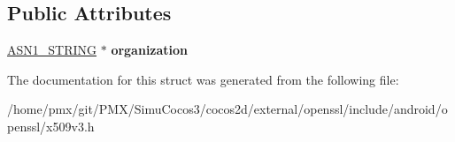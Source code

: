 \subsection*{Public Attributes}
\begin{DoxyCompactItemize}
\item 
\mbox{\label{structNOTICEREF__st_a7cf6f1f385520c4d1956533807111d9f}} 
\hyperlink{structasn1__string__st}{A\+S\+N1\+\_\+\+S\+T\+R\+I\+NG} $\ast$ {\bfseries organization}
\end{DoxyCompactItemize}


The documentation for this struct was generated from the following file\+:\begin{DoxyCompactItemize}
\item 
/home/pmx/git/\+P\+M\+X/\+Simu\+Cocos3/cocos2d/external/openssl/include/android/openssl/x509v3.\+h\end{DoxyCompactItemize}
